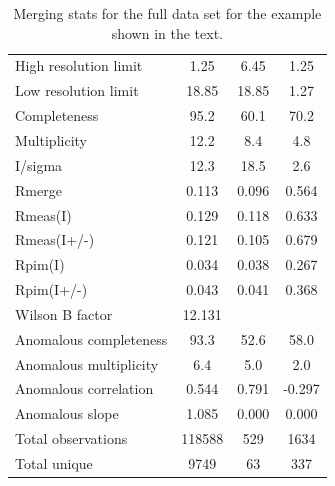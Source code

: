 \documentclass[a4paper, 11pt]{article}
\begin{document}
\begin{table}
\caption{Merging stats for the full data set for the example shown in
  the text.\label{table-merging-full}}
\begin{tabular}{lccc}
High resolution limit      &       1.25 &    6.45 &   1.25\\
Low resolution limit       &                18.85  & 18.85  &  1.27\\
Completeness               &                95.2   & 60.1  &  70.2\\
Multiplicity               &               12.2    & 8.4   &  4.8\\
I/sigma                    &               12.3    & 18.5   &  2.6\\
Rmerge                     &             0.113  & 0.096 &  0.564\\
Rmeas(I)                   &             0.129  & 0.118 &  0.633\\
Rmeas(I+/-)                &             0.121  & 0.105 &  0.679\\
Rpim(I)                    &             0.034  & 0.038 &  0.267\\
Rpim(I+/-)                 &             0.043  & 0.041 &  0.368\\
Wilson B factor            &            12.131& & \\
Anomalous completeness     &            93.3  &  52.6  &  58.0\\
Anomalous multiplicity     &           6.4    & 5.0  &   2.0\\
Anomalous correlation      &            0.544 &  0.791 & -0.297\\
Anomalous slope            &      1.085 &  0.000 &  0.000\\
Total observations         &       118588 & 529  &   1634\\
Total unique               &         9749  &  63 &     337\\
\end{tabular}
\end{table}
\end{document}
